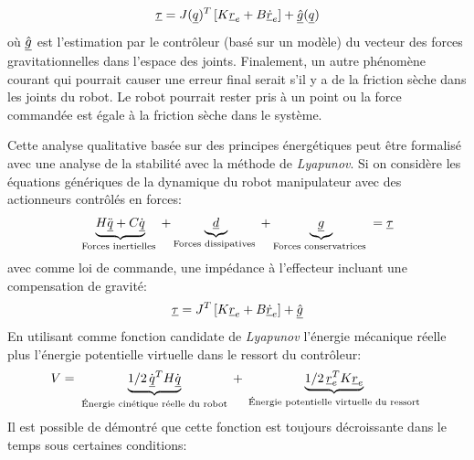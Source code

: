 \begin{align}
\underline{\tau} = J(\underline{q})^T   \left[ K \underline{r}_e + B \underline{\dot{r}}_e \right] + \underline{\hat{g}}(\underline{q})
\end{align} 
où $\underline{\hat{g}}$ est l'estimation par le contrôleur (basé sur un modèle) du vecteur des forces gravitationnelles dans l'espace des joints. Finalement, un autre phénomène courant qui pourrait causer une erreur final serait s'il y a de la friction sèche dans les joints du robot. Le robot pourrait rester pris à un point ou la force commandée est égale à la friction sèche dans le système.

Cette analyse qualitative basée sur des principes énergétiques peut être formalisé avec une analyse de la stabilité avec la méthode de \textit{Lyapunov}. Si on considère les équations génériques de la dynamique du robot manipulateur avec des actionneurs contrôlés en forces:
\begin{align}
\underbrace{
H \ddot{\underline{q}} + C \dot{\underline{q}} 
}_{\text{Forces inertielles }}
+ 
\underbrace{
\underline{d}
}_{\text{Forces dissipatives }}
+ 
\underbrace{
\underline{g} 
}_{\text{Forces conservatrices }}
= \underline{\tau}
\end{align}
avec comme loi de commande, une impédance à l'effecteur incluant une compensation de gravité:
\begin{align}
\underline{\tau} = J^T   \left[ K \underline{r}_e + B \underline{\dot{r}}_e \right] + \underline{\hat{g}}
\end{align}
En utilisant comme fonction candidate de \textit{Lyapunov} l'énergie mécanique réelle plus l'énergie potentielle virtuelle dans le ressort du contrôleur:
\begin{align}
V = 
\underbrace{
1/2 \, \dot{\underline{q}}^T H \dot{\underline{q}} 
}_{\text{ Énergie cinétique réelle du robot }}
+
\underbrace{
1/2 \, \underline{r}_e^T K \underline{r}_e
}_{\text{ Énergie potentielle virtuelle du ressort }}
\end{align}
Il est possible de démontré que cette fonction est toujours décroissante dans le temps sous certaines conditions:
